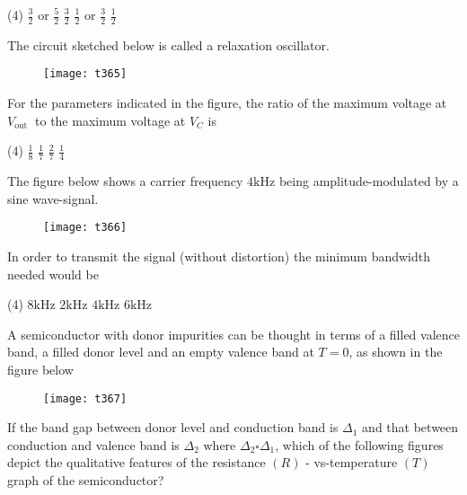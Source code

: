 \begin{questions}
\begin{minipage}{\textwidth}
\end{minipage}
\begin{tasks}(4)
	\task[\textbf{A.}] $\frac{3}{2}$ or $\frac{5}{2}$
	\task[\textbf{B.}] $\frac{3}{2}$
	\task[\textbf{C.}] $\frac{1}{2}$ or $\frac{3}{2}$
	\task[\textbf{D.}] $\frac{1}{2}$
\end{tasks}
\begin{minipage}{\textwidth}
	\question The circuit sketched below is called a relaxation oscillator.\\
	\begin{figure}[H]
		\centering
		\texttt{[image: t365]}
	\end{figure}
	For the parameters indicated in the figure, the ratio of the maximum voltage at $V_{\text {out }}$ to the maximum voltage at $V_{C}$ is
\end{minipage}
\begin{tasks}(4)
	\task[\textbf{A.}] $\frac{1}{8}$
	\task[\textbf{B.}] $\frac{1}{7}$
	\task[\textbf{C.}] $\frac{2}{7}$
	\task[\textbf{D.}] $\frac{1}{4}$
\end{tasks}
\begin{minipage}{\textwidth}
	\question The figure below shows a carrier frequency $4 \mathrm{kHz}$ being amplitude-modulated by a sine wave-signal.\\
	\begin{figure}[H]
		\centering
		\texttt{[image: t366]}
	\end{figure}
	In order to transmit the signal (without distortion) the minimum bandwidth needed would be
\end{minipage}
\begin{tasks}(4)
	\task[\textbf{A.}] $8 \mathrm{kHz}$
	\task[\textbf{B.}]   $2 \mathrm{kHz}$
	\task[\textbf{C.}]   $4 \mathrm{kHz}$
	\task[\textbf{D.}]   $6 \mathrm{kHz}$
\end{tasks}
\begin{minipage}{\textwidth}
	\question A semiconductor with donor impurities can be thought in terms of a filled valence band, a filled donor level and an empty valence band at $T=0$, as shown in the figure below \\
	\begin{figure}[H]
		\centering
		\texttt{[image: t367]}
	\end{figure}
	If the band gap between donor level and conduction band is $\Delta_{1}$ and that between conduction and valence band is $\Delta_{2}$ where $\Delta_{2} \square \Delta_{1}$, which of the following figures depict the qualitative features of the resistance $(R)$ - vs-temperature $(T)$ graph of the semiconductor?

\end{minipage}
\end{questions}
